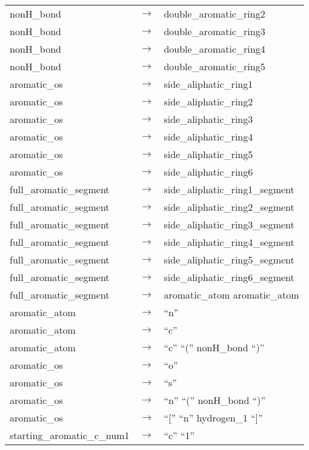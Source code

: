 \documentclass[../Document.tex]{subfiles}
\begin{document}
\begin{longtable}{m{} p{} p{}}
    nonH\_bond & $\rightarrow$ & double\_aromatic\_ring2 \\
    nonH\_bond & $\rightarrow$ & double\_aromatic\_ring3 \\
    nonH\_bond & $\rightarrow$ & double\_aromatic\_ring4 \\
    nonH\_bond & $\rightarrow$ & double\_aromatic\_ring5 \\
    aromatic\_os & $\rightarrow$ & side\_aliphatic\_ring1 \\
    aromatic\_os & $\rightarrow$ & side\_aliphatic\_ring2 \\
    aromatic\_os & $\rightarrow$ & side\_aliphatic\_ring3 \\
    aromatic\_os & $\rightarrow$ & side\_aliphatic\_ring4 \\
    aromatic\_os & $\rightarrow$ & side\_aliphatic\_ring5 \\
    aromatic\_os & $\rightarrow$ & side\_aliphatic\_ring6 \\
    full\_aromatic\_segment & $\rightarrow$ & side\_aliphatic\_ring1\_segment \\
    full\_aromatic\_segment & $\rightarrow$ & side\_aliphatic\_ring2\_segment \\
    full\_aromatic\_segment & $\rightarrow$ & side\_aliphatic\_ring3\_segment \\
    full\_aromatic\_segment & $\rightarrow$ & side\_aliphatic\_ring4\_segment \\
    full\_aromatic\_segment & $\rightarrow$ & side\_aliphatic\_ring5\_segment \\
    full\_aromatic\_segment & $\rightarrow$ & side\_aliphatic\_ring6\_segment \\
    full\_aromatic\_segment & $\rightarrow$ & aromatic\_atom aromatic\_atom \\
    aromatic\_atom & $\rightarrow$ & ``n'' \\
    aromatic\_atom & $\rightarrow$ & ``c'' \\
    aromatic\_atom & $\rightarrow$ & ``c'' ``('' nonH\_bond ``)'' \\
    aromatic\_os & $\rightarrow$ & ``o'' \\
    aromatic\_os & $\rightarrow$ & ``s'' \\
    aromatic\_os & $\rightarrow$ & ``n'' ``('' nonH\_bond ``)'' \\
    aromatic\_os & $\rightarrow$ & ``['' ``n'' hydrogen\_1 ``]'' \\
    starting\_aromatic\_c\_num1 & $\rightarrow$ & ``c'' ``1'' \\

\end{longtable}
\end{document}
